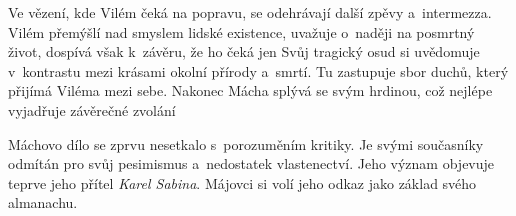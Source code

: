 Ve vězení, kde Vilém čeká na popravu, se odehrávají další zpěvy
a~intermezza. Vilém přemýšlí nad smyslem lidské existence, uvažuje
o~naději na posmrtný život, dospívá však k~závěru, že ho čeká jen
 Svůj tragický osud si uvědomuje v~kontrastu mezi krásami
okolní přírody a~smrtí. Tu zastupuje sbor duchů, který přijímá Viléma
mezi sebe. Nakonec Mácha splývá se svým hrdinou, což nejlépe vyjadřuje
závěrečné zvolání 

Máchovo dílo se zprvu nesetkalo s~porozuměním kritiky. Je svými
současníky odmítán pro svůj pesimismus a~nedostatek vlastenectví. Jeho
význam objevuje teprve jeho přítel \emph{Karel Sabina}. Májovci si volí
jeho odkaz jako základ svého almanachu.